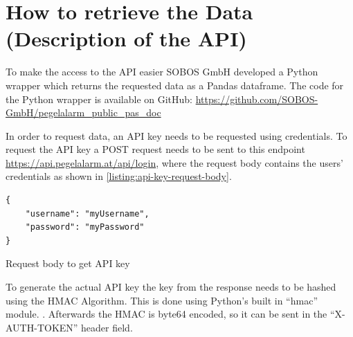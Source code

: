

\section{How to retrieve the Data (Description of the API)}
To make the access to the API easier SOBOS GmbH developed a Python wrapper which returns the requested data as a Pandas dataframe.\cite{PandasDocumentationPandas} The code for the Python wrapper is available on GitHub\cite{GitHub}: \url{https://github.com/SOBOS-GmbH/pegelalarm_public_pas_doc} \cite{strassmayrPegelalarmAPIWrapper2022}

In order to request data, an API key needs to be requested using credentials. To request the API key a POST request needs to be sent to this endpoint \url{https://api.pegelalarm.at/api/login}, where the request body contains the users' credentials as shown in \autoref{listing:api-key-request-body}. 
\begin{listing}
\begin{verbatim}
{
    "username": "myUsername",
    "password": "myPassword"
}
\end{verbatim}
\caption{Request body to get API key}
\label{listing:api-key-request-body}
\end{listing}
To generate the actual API key the key from the response needs to be hashed using the \ac{HMAC} Algorithm. This is done using Python's built in ``hmac'' module. \cite{HmacKeyedHashingMessage}. Afterwards the \ac{HMAC} is byte64 encoded, so it can be sent in the ``X-AUTH-TOKEN'' header field.

